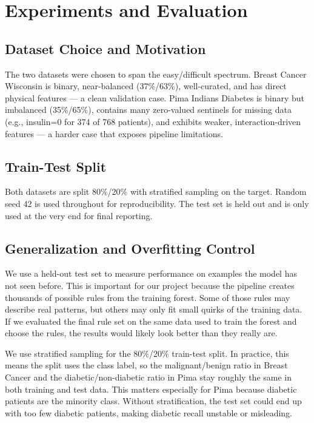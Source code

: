 \documentclass[11pt]{article}
\begin{document}
\section{Experiments and Evaluation}

\subsection{Dataset Choice and Motivation}

The two datasets were chosen to span the easy/difficult spectrum. Breast Cancer Wisconsin is binary, near-balanced (37\%/63\%), well-curated, and has direct physical features --- a clean validation case. Pima Indians Diabetes is binary but imbalanced (35\%/65\%), contains many zero-valued sentinels for missing data (e.g., insulin=0 for 374 of 768 patients), and exhibits weaker, interaction-driven features --- a harder case that exposes pipeline limitations.

\subsection{Train-Test Split}

Both datasets are split 80\%/20\% with stratified sampling on the target. Random seed 42 is used throughout for reproducibility. The test set is held out and is only used at the very end for final reporting.

\subsection{Generalization and Overfitting Control}

We use a held-out test set to measure performance on examples the model has not seen before. This is important for our project because the pipeline creates thousands of possible rules from the training forest. Some of those rules may describe real patterns, but others may only fit small quirks of the training data. If we evaluated the final rule set on the same data used to train the forest and choose the rules, the results would likely look better than they really are.

We use stratified sampling for the 80\%/20\% train-test split. In practice, this means the split uses the class label, so the malignant/benign ratio in Breast Cancer and the diabetic/non-diabetic ratio in Pima stay roughly the same in both training and test data. This matters especially for Pima because diabetic patients are the minority class. Without stratification, the test set could end up with too few diabetic patients, making diabetic recall unstable or misleading.
\end{document}
